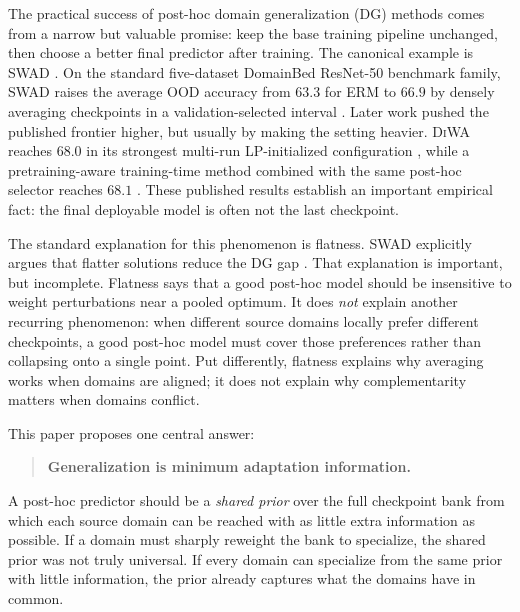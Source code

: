 \documentclass{article}
\newcommand{\ood}{OOD}
\newcommand{\swad}{\textup{\textsc{SWAD}}}
\newcommand{\diwa}{\textup{\textsc{DiWA}}}
\begin{document}
The practical success of post-hoc domain generalization (DG) methods comes from a narrow but valuable promise: keep the base training pipeline unchanged, then choose a better final predictor after training. The canonical example is \swad{} \citep{cha2021swad}. On the standard five-dataset DomainBed ResNet-50 benchmark family, \swad{} raises the average \ood{} accuracy from \(63.3\) for ERM to \(66.9\) by densely averaging checkpoints in a validation-selected interval \citep{cha2021swad}. Later work pushed the published frontier higher, but usually by making the setting heavier. \diwa{} reaches \(68.0\) in its strongest multi-run LP-initialized configuration \citep{rame2022diwa}, while a pretraining-aware training-time method combined with the same post-hoc selector reaches \(68.1\) \citep{cha2022miro}. These published results establish an important empirical fact: the final deployable model is often not the last checkpoint.

The standard explanation for this phenomenon is flatness. \swad{} explicitly argues that flatter solutions reduce the DG gap \citep{cha2021swad}. That explanation is important, but incomplete. Flatness says that a good post-hoc model should be insensitive to weight perturbations near a pooled optimum. It does \emph{not} explain another recurring phenomenon: when different source domains locally prefer different checkpoints, a good post-hoc model must cover those preferences rather than collapsing onto a single point. Put differently, flatness explains why averaging works when domains are aligned; it does not explain why complementarity matters when domains conflict.

This paper proposes one central answer:
\begin{quote}
\textbf{Generalization is minimum adaptation information.}
\end{quote}
A post-hoc predictor should be a \emph{shared prior} over the full checkpoint bank from which each source domain can be reached with as little extra information as possible. If a domain must sharply reweight the bank to specialize, the shared prior was not truly universal. If every domain can specialize from the same prior with little information, the prior already captures what the domains have in common.
\end{document}

